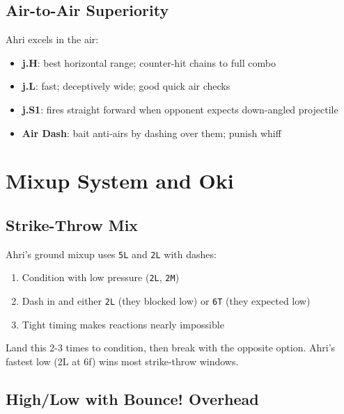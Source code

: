 \documentclass[12pt, a4paper]{report}
\newcommand{\notation}[1]{{\small\texttt{\textcolor{ahriCyan}{#1}}}}
\newcommand{\movename}[1]{\textbf{\textcolor{ahriGold}{#1}}}
\begin{document}
\section{Air-to-Air Superiority}

Ahri excels in the air:

\begin{itemize}
  \item \movename{j.H}: best horizontal range; counter-hit chains to full combo
  \item \movename{j.L}: fast; deceptively wide; good quick air checks
  \item \movename{j.S1}: fires straight forward when opponent expects down-angled projectile
  \item \movename{Air Dash}: bait anti-airs by dashing over them; punish whiff
\end{itemize}

\clearpage

\chapter{Mixup System and Oki}

\section{Strike-Throw Mix}

Ahri's ground mixup uses \notation{5L} and \notation{2L} with dashes:

\begin{enumerate}
  \item Condition with low pressure (\notation{2L}, \notation{2M})
  \item Dash in and either \notation{2L} (they blocked low) or \notation{6T} (they expected low)
  \item Tight timing makes reactions nearly impossible
\end{enumerate}

\begin{tipbox}
Land this 2-3 times to condition, then break with the opposite option. Ahri's fastest low (2L at 6f) wins most strike-throw windows.
\end{tipbox}

\section{High/Low with Bounce! Overhead}
\end{document}
